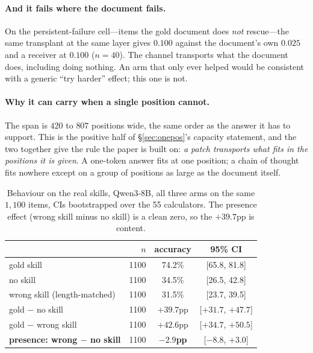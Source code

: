 \documentclass{article}
\begin{document}
\paragraph{And it fails where the document fails.} On the persistent-failure
cell---items the gold document does \emph{not} rescue---the same transplant at
the same layer gives $0.100$ against the document's own $0.025$ and a receiver at
$0.100$ ($n=40$). The channel transports what the document does, including doing
nothing. An arm that only ever helped would be consistent with a generic ``try
harder'' effect; this one is not.

\paragraph{Why it can carry when a single position cannot.} The span is $420$ to
$807$ positions wide, the same order as the answer it has to support. This is the
positive half of \S\ref{sec:onepos}'s capacity statement, and the two together
give the rule the paper is built on: \emph{a patch transports what fits in the
positions it is given}. A one-token answer fits at one position; a chain of
thought fits nowhere except on a group of positions as large as the document
itself.


\begin{table}[h]
\caption{Behaviour on the real skills, Qwen3-8B, all three arms on the same
$1{,}100$ items, CIs bootstrapped over the 55 calculators. The presence effect
(wrong skill minus no skill) is a clean zero, so the $+39.7$pp is content.}
\label{tab:behaviour}
\centering
\small
\begin{tabular}{lrcc}
\toprule
& $n$ & accuracy & 95\% CI \\
\midrule
gold skill                & 1100 & 74.2\% & [65.8, 81.8] \\
no skill                  & 1100 & 34.5\% & [26.5, 42.8] \\
wrong skill (length-matched) & 1100 & 31.5\% & [23.7, 39.5] \\
\midrule
gold $-$ no skill         & 1100 & $+39.7$pp & [$+31.7$, $+47.7$] \\
gold $-$ wrong skill      & 1100 & $+42.6$pp & [$+34.7$, $+50.5$] \\
\textbf{presence: wrong $-$ no skill} & 1100 & $\mathbf{-2.9}$\textbf{pp} & [$-8.8$, $+3.0$] \\
\bottomrule
\end{tabular}
\end{table}
\end{document}
